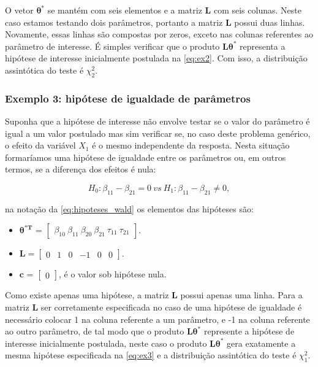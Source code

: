 \documentclass[AMA,STIX1COL]{WileyNJD-v2}
\begin{document}
O vetor $\boldsymbol{\theta^{*}}$ se mantém com seis elementos e a matriz $\boldsymbol{L}$ com seis colunas. Neste caso estamos testando dois parâmetros, portanto a matriz $\boldsymbol{L}$ possui duas linhas. Novamente, essas linhas são compostas por zeros, exceto nas colunas referentes ao parâmetro de interesse. É simples verificar que o produto $\boldsymbol{L}\boldsymbol{\theta^{*}}$ representa a hipótese de interesse inicialmente postulada na \autoref{eq:ex2}. Com isso, a distribuição assintótica do teste é $\chi^2_2$.

\subsubsection{Exemplo 3: hipótese de igualdade de parâmetros}

Suponha que a hipótese de interesse não envolve testar se o valor do parâmetro é igual a um valor postulado mas sim verificar se, no caso deste problema genérico, o efeito da variável $X_1$ é o mesmo independente da resposta. Nesta situação formaríamos uma hipótese de igualdade entre os parâmetros ou, em outros termos, se a diferença dos efeitos é nula:

\begin{equation}
\label{eq:ex3}
H_0: \beta_{11} - \beta_{21} = 0 \ vs \ H_1: \beta_{11} - \beta_{21} \neq 0,
\end{equation}

\noindent na notação da \autoref{eq:hipoteses_wald} os elementos das hipóteses são:

\begin{itemize}
  
  \item $\boldsymbol{\theta^{*T}}$ = $\begin{bmatrix} \beta_{10} \  \beta_{11} \ \beta_{20} \ \beta_{21} \ \tau_{11} \ \tau_{21} \end{bmatrix}$.


\item $\boldsymbol{L} = \begin{bmatrix} 0 & 1 & 0 & -1 & 0 & 0  \end{bmatrix}.$
 
\item $\boldsymbol{c}$ = $\begin{bmatrix} 0 \end{bmatrix}$, é o valor sob hipótese nula. 

\end{itemize}

Como existe apenas uma hipótese, a matriz $\boldsymbol{L}$ possui apenas uma linha. Para a matriz $\boldsymbol{L}$ ser corretamente especificada no caso de uma hipótese de igualdade é necessário colocar 1 na coluna referente a um parâmetro, e -1 na coluna referente ao outro parâmetro, de tal modo que o produto $\boldsymbol{L}\boldsymbol{\theta^{*}}$ represente a hipótese de interesse inicialmente postulada, neste caso o produto $\boldsymbol{L}\boldsymbol{\theta^{*}}$ gera exatamente a mesma hipótese especificada na \autoref{eq:ex3} e a distribuição assintótica do teste é $\chi^2_1$.
\end{document}
